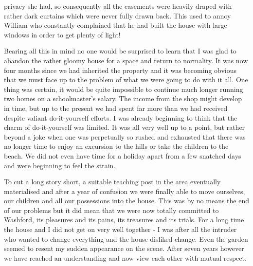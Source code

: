 privacy she had, so consequently all the casements were heavily draped with rather dark curtains which were never fully drawn back. This used to annoy William who constantly complained that he had built the house with large windows in order to get plenty of light!

Bearing all this in mind no one would be surprised to learn that I was glad to abandon the rather gloomy house for a space and return to normality. It was now four months since we had inherited the property and it was becoming obvious that we must face up to the problem of what we were going to do with it all. One thing was certain, it would be quite impossible to continue much longer running two homes on a schoolmaster's salary. The income from the shop might develop in time, but up to the present we had spent far more than we had received despite valiant do-it-yourself efforts. I was already beginning to think that the charm of do-it-yourself was limited. It was all very well up to a point, but rather beyond a joke when one was perpetually so rushed and exhausted that there was no longer time to enjoy an excursion to the hills or take the children to the beach. We did not even have time for a holiday apart from a few snatched days and were beginning to feel the strain.

To cut a long story short, a suitable teaching post in the area eventually materialised and after a year of confusion we were finally able to move ourselves, our children and all our possessions into the house. This was by no means the end of our problems but it did mean that we were now totally committed to Washford, its pleasures and its pains, its treasures and its trials. For a long time the house and I did not get on very well together - I was after all the intruder who wanted to change everything and the house disliked change. Even the garden seemed to resent my sudden appearance on the scene. After seven years however we have reached an understanding and now view each other with mutual respect.